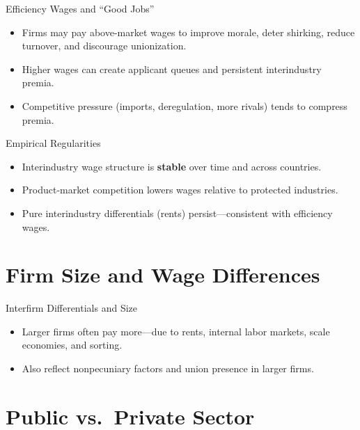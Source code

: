 \documentclass[aspectratio=169]{beamer}
\begin{document}
\begin{frame}{Efficiency Wages and “Good Jobs”}
\transfade
\begin{itemize}[<+->]
  \item Firms may pay above-market wages to improve morale, deter shirking, reduce turnover, and discourage unionization.
  \item Higher wages can create applicant queues and persistent interindustry premia.
  \item Competitive pressure (imports, deregulation, more rivals) tends to compress premia.
\end{itemize}
\end{frame}

\begin{frame}{Empirical Regularities}
\transfade
\begin{itemize}[<+->]
  \item Interindustry wage structure is \textbf{stable} over time and across countries.
  \item Product-market competition lowers wages relative to protected industries.
  \item Pure interindustry differentials (rents) persist—consistent with efficiency wages.
\end{itemize}
\end{frame}

\section{Firm Size and Wage Differences}

\begin{frame}{Interfirm Differentials and Size}
\transfade
\begin{itemize}[<+->]
  \item Larger firms often pay more—due to rents, internal labor markets, scale economies, and sorting.
  \item Also reflect nonpecuniary factors and union presence in larger firms.
\end{itemize}
\end{frame}

\section{Public vs.\ Private Sector}
\end{document}
